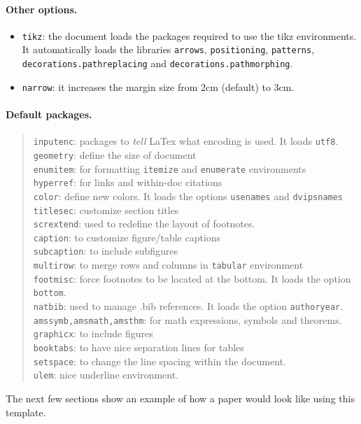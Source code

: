 \documentclass[12pt]{bppaper}
\begin{document}
\paragraph{Other options.}
\begin{itemize}
\item \texttt{tikz}: the document loads the packages required to use the tikz environments. It automatically loads the libraries \texttt{arrows}, \texttt{positioning}, \texttt{patterns}, \texttt{decorations.pathreplacing} and \texttt{decorations.pathmorphing}.
\item \texttt{narrow}: it increases the margin size from 2cm (default) to 3cm.
\end{itemize}

\paragraph{Default packages.}
\begin{quote}
\texttt{inputenc}: packages to \textit{tell} LaTex what encoding is used. It loads \texttt{utf8}. \\
\texttt{geometry}: define the size of document\\
\texttt{enumitem}: for formatting \texttt{itemize} and \texttt{enumerate} environments\\
\texttt{hyperref}: for links and within-doc citations\\
\texttt{color}: define new colors. It loads the options \texttt{usenames} and \texttt{dvipsnames}\\
\texttt{titlesec}: customize section titles\\
\texttt{scrextend}: used to redefine the layout of footnotes.\\
\texttt{caption}: to customize figure/table captions\\
\texttt{subcaption}: to include subfigures\\
\texttt{multirow}: to merge rows and columns in \texttt{tabular} environment\\
\texttt{footmisc}: force footnotes to be located at the bottom. It loads the option \texttt{bottom}.\\
\texttt{natbib}: used to manage .bib references. It loads the option \texttt{authoryear}.\\
\texttt{amssymb,amsmath,amsthm}: for math expressions, symbols and theorems.\\
\texttt{graphicx}: to include figures\\
\texttt{booktabs}: to have nice separation lines for tables\\
\texttt{setspace}: to change the line spacing within the document.\\
\texttt{ulem}: nice underline environment.
\end{quote}
The next few sections show an example of how a paper would look like using this template.
\end{document}
